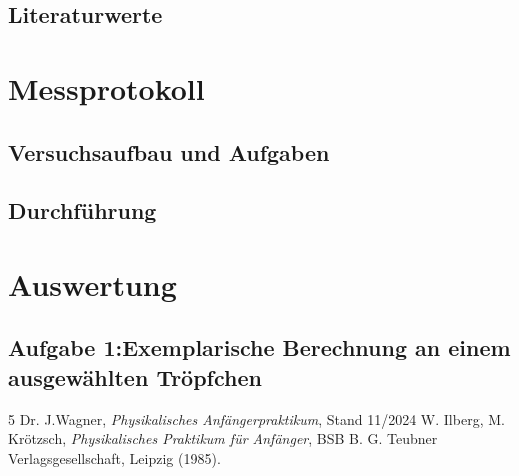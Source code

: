 \documentclass[12pt,a4paper,titlepage]{scrartcl}
\numberwithin{equation}{section}
\numberwithin{table}{section}
\numberwithin{figure}{section}
\begin{document}
\subsection{Literaturwerte}





\section{Messprotokoll}

\subsection{Versuchsaufbau und Aufgaben}

\subsection{Durchführung}

\section{Auswertung}

\subsection{Aufgabe 1:Exemplarische Berechnung an einem ausgewählten Tröpfchen}




\clearpage

\listoffigures


\listoftables

\begin{thebibliography}{5}
     Dr. J.Wagner, \emph{Physikalisches Anfängerpraktikum}, Stand 11/2024
     W. Ilberg, M. Krötzsch, \emph{Physikalisches Praktikum für Anfänger}, BSB B. G. Teubner Verlagsgesellschaft, Leipzig (1985).
\end{thebibliography}
\end{document}
